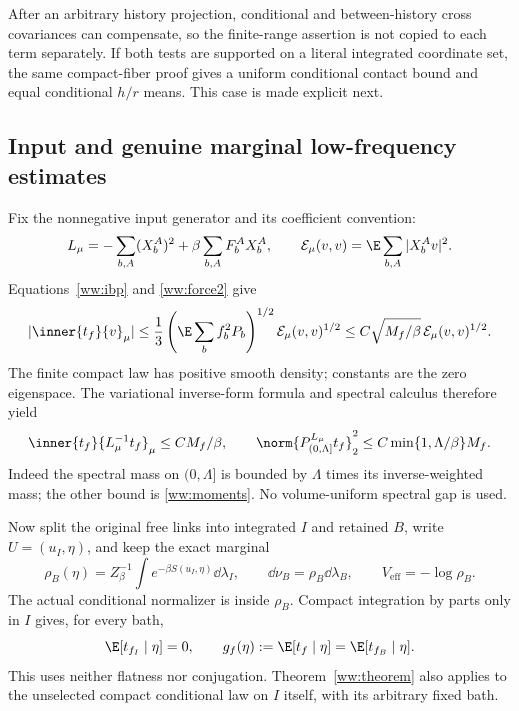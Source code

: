 After an arbitrary history projection, conditional and between-history cross covariances can compensate, so the finite-range assertion is not copied to each term separately. If both tests are supported on a literal integrated coordinate set, the same compact-fiber proof gives a uniform conditional contact bound and equal conditional $h/r$ means. This case is made explicit next.

\subsection{Input and genuine marginal low-frequency estimates}

Fix the nonnegative input generator and its coefficient convention:
\begin{equation}
 L_\mu=-\sum_{b,A}(X_b^A)^2
          +\beta\sum_{b,A}F_b^AX_b^A,
 \qquad
 \mathcal E_\mu(v,v)=\E\sum_{b,A}|X_b^Av|^2.
 \label{ww:generator}
\end{equation}
Equations~\eqref{ww:ibp} and \eqref{ww:force2} give
\begin{equation}
 |\inner{t_f}{v}_\mu|
 \le \frac13
       \left(\E\sum_bf_b^2P_b\right)^{1/2}
           \mathcal E_\mu(v,v)^{1/2}
 \le C\sqrt{M_f/\beta}\,\mathcal E_\mu(v,v)^{1/2}.
 \label{ww:duality}
\end{equation}
The finite compact law has positive smooth density; constants are the zero eigenspace. The variational inverse-form formula and spectral calculus therefore yield
\begin{equation}
 \inner{t_f}{L_\mu^{-1}t_f}_\mu\le CM_f/\beta,
 \qquad
 \norm{P_{(0,\Lambda]}^{L_\mu}t_f}_2^2
       \le C\min\{1,\Lambda/\beta\}M_f.
 \label{ww:inputlow}
\end{equation}
Indeed the spectral mass on $(0,\Lambda]$ is bounded by $\Lambda$ times its inverse-weighted mass; the other bound is \eqref{ww:moments}. No volume-uniform spectral gap is used.

Now split the original free links into integrated $I$ and retained $B$, write $U=(u_I,\eta)$, and keep the exact marginal
\begin{equation}
 \rho_B(\eta)=Z_\beta^{-1}
       \int e^{-\beta S(u_I,\eta)}\dd\lambda_I,
 \qquad
 \dd\nu_B=\rho_B\dd\lambda_B,\qquad
 V_{\mathrm{eff}}=-\log\rho_B.
 \label{ww:marginal}
\end{equation}
The actual conditional normalizer is inside $\rho_B$. Compact integration by parts only in $I$ gives, for every bath,
\begin{equation}
 \E[t_{f_I}\mid\eta]=0,\qquad
 g_f(\eta):=\E[t_f\mid\eta]=\E[t_{f_B}\mid\eta].
 \label{ww:coordinatezero}
\end{equation}
This uses neither flatness nor conjugation. Theorem~\ref{ww:theorem} also applies to the unselected compact conditional law on $I$ itself, with its arbitrary fixed bath.

